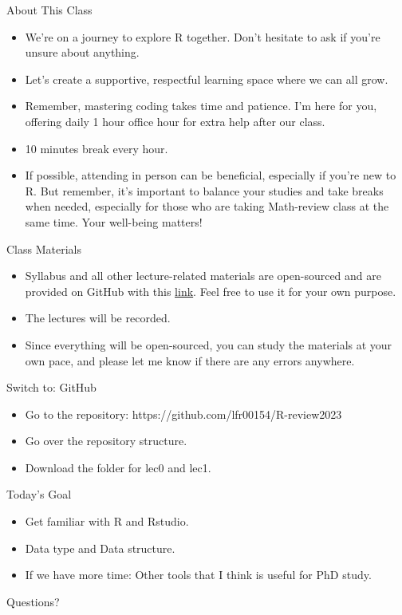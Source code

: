 \begin{frame}{About This Class}
\begin{itemize}
    \item We're on a journey to explore R together. Don't hesitate to ask if you're unsure about anything.
    \item Let's create a supportive, respectful learning space where we can all grow.
    \item Remember, mastering coding takes time and patience. I'm here for you, offering daily 1 hour office hour for extra help after our class. 
    \item 10 minutes break every hour.
    \item If possible, attending in person can be beneficial, especially if you're new to R. But remember, it's important to balance your studies and take breaks when needed, especially for those who are taking Math-review class at the same time. Your well-being matters! 
\end{itemize}

\end{frame}

\begin{frame}{Class Materials}
\begin{itemize}
    \item Syllabus and all other lecture-related materials are open-sourced and are provided on GitHub with this \href{https://github.com/lfr00154/R-review2023}{\underline{link}}. Feel free to use it for your own purpose. 
    \item The lectures will be recorded.
    \item Since everything will be open-sourced, you can study the materials at your own pace, and please let me know if there are any errors anywhere. 
\end{itemize}
    
\end{frame}

\begin{frame}{Switch to: GitHub} 
    \begin{itemize}
        \item Go to the repository: https://github.com/lfr00154/R-review2023
        \item Go over the repository structure.
        \item Download the folder for lec0 and lec1.
    \end{itemize}
\end{frame}

\begin{frame}{Today's Goal} 
    \begin{itemize}
        \item Get familiar with R and Rstudio.
        \item Data type and Data structure.
        \item If we have more time: Other tools that I think is useful for PhD study.
    \end{itemize}
\end{frame}

\begin{frame}[fragile]
    \Large Questions? 
\end{frame}

